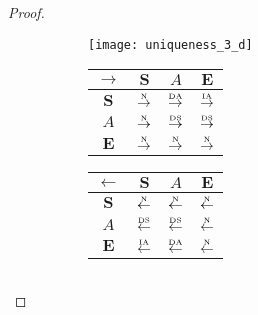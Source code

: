 \begin{proof}
\begin{figure}[htbp]
  \begin{subfigure}{1\textwidth}
    \vspace{1em}
    \centering
    \begin{minipage}[b]{1\textwidth}
      \centering
      \texttt{[image: uniqueness\_3\_d]}
    \end{minipage}
    \begin{minipage}[b]{0.3\textwidth}
      \vspace{1em}
      \centering
      \begin{tabular}{|c|c|c|c|} \hline
        $\rightarrow$ & $\bm{S}$ & $A$ & $\bm{E}$\\ \hline
        $\bm{S}$ & $\overset{\text{\tiny{N}}}{\rightarrow}$ & $\overset{\text{\tiny{DA}}}{\rightarrow}$ & $\overset{\text{\tiny{IA}}}{\rightarrow}$\\ \hline
        $A$ & $\overset{\text{\tiny{N}}}{\rightarrow}$ & $\overset{\text{\tiny{DS}}}{\rightarrow}$ & $\overset{\text{\tiny{DS}}}{\rightarrow}$\\ \hline
        $\bm{E}$ & $\overset{\text{\tiny{N}}}{\rightarrow}$ & $\overset{\text{\tiny{N}}}{\rightarrow}$ & $\overset{\text{\tiny{N}}}{\rightarrow}$\\ \hline
      \end{tabular}
    \end{minipage}
    \begin{minipage}[b]{0.3\textwidth}
      \vspace{1em}
      \centering
      \begin{tabular}{|c|c|c|c|} \hline
        $\leftarrow$ & $\bm{S}$ & $A$ & $\bm{E}$\\ \hline
        $\bm{S}$ & $\overset{\text{\tiny{N}}}{\leftarrow}$ & $\overset{\text{\tiny{N}}}{\leftarrow}$ & $\overset{\text{\tiny{N}}}{\leftarrow}$\\ \hline
        $A$ & $\overset{\text{\tiny{DS}}}{\leftarrow}$ & $\overset{\text{\tiny{DS}}}{\leftarrow}$ & $\overset{\text{\tiny{N}}}{\leftarrow}$\\ \hline
        $\bm{E}$ & $\overset{\text{\tiny{IA}}}{\leftarrow}$ & $\overset{\text{\tiny{DA}}}{\leftarrow}$ & $\overset{\text{\tiny{N}}}{\leftarrow}$\\ \hline
      \end{tabular}
    \end{minipage}
    \begin{minipage}[b]{0.3\textwidth}
      \vspace{1em}
      \centering
      \begin{tabular}{|c|c|c|c|} \hline

\end{tabular}
\end{minipage}
\end{subfigure}
\end{figure}
\end{proof}
